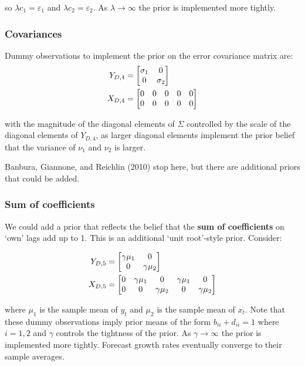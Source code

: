 \documentclass[
  letterpaper,
]{book}
\begin{document}
so \(\lambda c_1 = \varepsilon_1\) and \(\lambda c_2 = \varepsilon_2\).
As \(\lambda \rightarrow \infty\) the prior is implemented more tightly.

\hypertarget{covariances}{%
\subsubsection{Covariances}\label{covariances}}

Dummy observations to implement the prior on the error covariance matrix
are: \begin{align*}
  Y_{D,4} &= \left[\begin{matrix}\sigma_1 & 0 \cr 0 & \sigma_2\end{matrix}\right] \\
  X_{D,4} &= \left[\begin{matrix}0 & 0 & 0 & 0 & 0 \cr
    0 & 0 & 0 & 0 & 0 \end{matrix}\right]
\end{align*}

with the magnitude of the diagonal elements of \(\Sigma\) controlled by
the scale of the diagonal elements of \(Y_{D,4}\), as larger diagonal
elements implement the prior belief that the variance of \(\nu_1\) and
\(\nu_2\) is larger.

Banbura, Giannone, and Reichlin (2010) stop here, but there are
additional priors that could be added.

\hypertarget{sum-of-coefficients}{%
\subsubsection{Sum of coefficients}\label{sum-of-coefficients}}

We could add a prior that reflects the belief that the \textbf{sum of
coefficients} on `own' lags add up to 1. This is an additional `unit
root'-style prior. Consider:

\begin{align*}
  Y_{D,5} &= \left[\begin{matrix} \gamma\mu_1 & 0\cr 0 & \gamma\mu_2\end{matrix}\right] \\
  X_{D,5} &= \left [ \begin{matrix} 0 & \gamma\mu_1 & 0 & \gamma\mu_1 & 0\cr
    0 & 0 & \gamma\mu_2 & 0 & \gamma\mu_2\end{matrix}\right]
\end{align*}

where \(\mu_1\) is the sample mean of \(y_t\) and \(\mu_2\) is the
sample mean of \(x_t\). Note that these dummy observations imply prior
means of the form \(b_{ii} + d_{ii} = 1\) where \(i = 1, 2\) and
\(\gamma\) controls the tightness of the prior. As
\(\gamma \rightarrow \infty\) the prior is implemented more tightly.
Forecast growth rates eventually converge to their sample averages.
\end{document}
